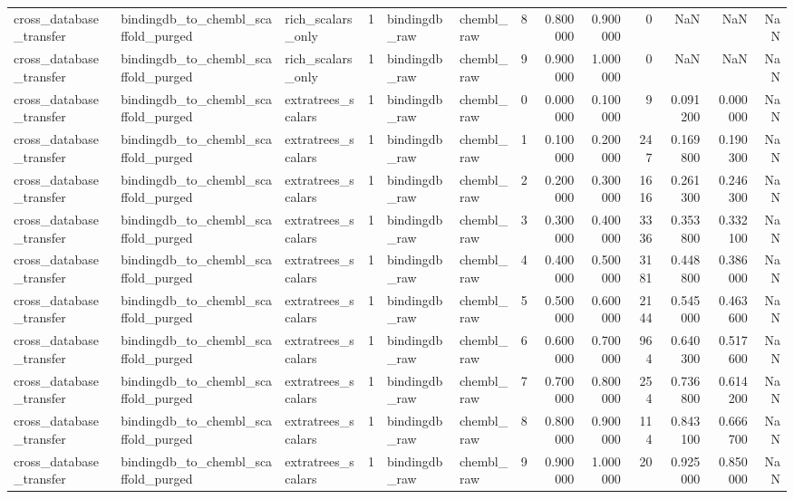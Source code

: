 \begin{longtable}{lllrllrrrrrrr}
cross\_database\_transfer & bindingdb\_to\_chembl\_scaffold\_purged & rich\_scalars\_only & 1 & bindingdb\_raw & chembl\_raw & 8 & 0.800000 & 0.900000 & 0 & NaN & NaN & NaN \\
cross\_database\_transfer & bindingdb\_to\_chembl\_scaffold\_purged & rich\_scalars\_only & 1 & bindingdb\_raw & chembl\_raw & 9 & 0.900000 & 1.000000 & 0 & NaN & NaN & NaN \\
cross\_database\_transfer & bindingdb\_to\_chembl\_scaffold\_purged & extratrees\_scalars & 1 & bindingdb\_raw & chembl\_raw & 0 & 0.000000 & 0.100000 & 9 & 0.091200 & 0.000000 & NaN \\
cross\_database\_transfer & bindingdb\_to\_chembl\_scaffold\_purged & extratrees\_scalars & 1 & bindingdb\_raw & chembl\_raw & 1 & 0.100000 & 0.200000 & 247 & 0.169800 & 0.190300 & NaN \\
cross\_database\_transfer & bindingdb\_to\_chembl\_scaffold\_purged & extratrees\_scalars & 1 & bindingdb\_raw & chembl\_raw & 2 & 0.200000 & 0.300000 & 1616 & 0.261300 & 0.246300 & NaN \\
cross\_database\_transfer & bindingdb\_to\_chembl\_scaffold\_purged & extratrees\_scalars & 1 & bindingdb\_raw & chembl\_raw & 3 & 0.300000 & 0.400000 & 3336 & 0.353800 & 0.332100 & NaN \\
cross\_database\_transfer & bindingdb\_to\_chembl\_scaffold\_purged & extratrees\_scalars & 1 & bindingdb\_raw & chembl\_raw & 4 & 0.400000 & 0.500000 & 3181 & 0.448800 & 0.386000 & NaN \\
cross\_database\_transfer & bindingdb\_to\_chembl\_scaffold\_purged & extratrees\_scalars & 1 & bindingdb\_raw & chembl\_raw & 5 & 0.500000 & 0.600000 & 2144 & 0.545000 & 0.463600 & NaN \\
cross\_database\_transfer & bindingdb\_to\_chembl\_scaffold\_purged & extratrees\_scalars & 1 & bindingdb\_raw & chembl\_raw & 6 & 0.600000 & 0.700000 & 964 & 0.640300 & 0.517600 & NaN \\
cross\_database\_transfer & bindingdb\_to\_chembl\_scaffold\_purged & extratrees\_scalars & 1 & bindingdb\_raw & chembl\_raw & 7 & 0.700000 & 0.800000 & 254 & 0.736800 & 0.614200 & NaN \\
cross\_database\_transfer & bindingdb\_to\_chembl\_scaffold\_purged & extratrees\_scalars & 1 & bindingdb\_raw & chembl\_raw & 8 & 0.800000 & 0.900000 & 114 & 0.843100 & 0.666700 & NaN \\
cross\_database\_transfer & bindingdb\_to\_chembl\_scaffold\_purged & extratrees\_scalars & 1 & bindingdb\_raw & chembl\_raw & 9 & 0.900000 & 1.000000 & 20 & 0.925000 & 0.850000 & NaN \\

\end{longtable}

